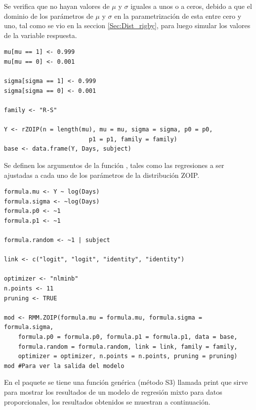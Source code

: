 Se verifica que no hayan valores de $\mu$ y $\sigma$ iguales a unos o a ceros, debido a que el dominio de los par\'{a}metros de $\mu$ y $\sigma$ en la parametrizaci\'{o}n de \cite{Stasinopoulos2} esta entre cero y uno, tal como se vio en la seccion \ref{Sec:Dist_rigby}, para luego simular los valores de la variable respuesta.

\begin{verbatim}
mu[mu == 1] <- 0.999
mu[mu == 0] <- 0.001

sigma[sigma == 1] <- 0.999
sigma[sigma == 0] <- 0.001

family <- "R-S"

Y <- rZOIP(n = length(mu), mu = mu, sigma = sigma, p0 = p0, 
						p1 = p1, family = family)
base <- data.frame(Y, Days, subject)
\end{verbatim}

Se definen los argumentos de la funci\'{o}n , tales como las regresiones a ser ajustadas a cada uno de los par\'{a}metros de la distribuci\'{o}n ZOIP.

\begin{verbatim}
formula.mu <- Y ~ log(Days)
formula.sigma <- ~log(Days)
formula.p0 <- ~1
formula.p1 <- ~1

formula.random <- ~1 | subject

link <- c("logit", "logit", "identity", "identity")

optimizer <- "nlminb"
n.points <- 11
pruning <- TRUE

mod <- RMM.ZOIP(formula.mu = formula.mu, formula.sigma = formula.sigma, 
    formula.p0 = formula.p0, formula.p1 = formula.p1, data = base, 
    formula.random = formula.random, link = link, family = family, 
    optimizer = optimizer, n.points = n.points, pruning = pruning)
mod #Para ver la salida del modelo
\end{verbatim}

En el paquete  se tiene una funci\'{o}n gen\'{e}rica (m\'{e}todo S3) llamada print que sirve para mostrar los resultados de un modelo de regresi\'{o}n mixto para datos proporcionales, los resultados obtenidos se muestran a continuaci\'{o}n.

